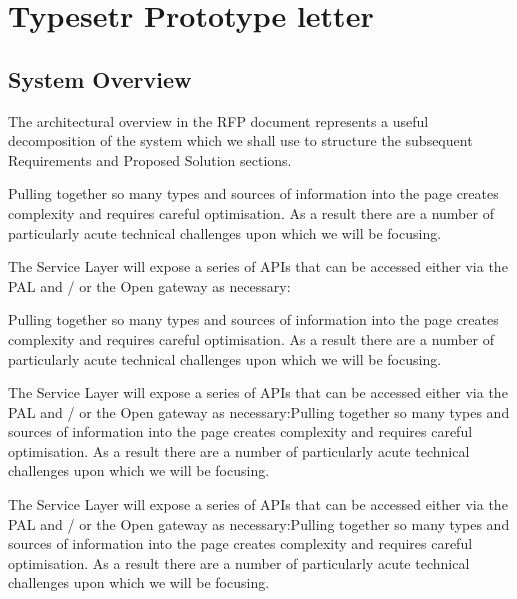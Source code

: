 \documentclass[12pt, a4paper, parskip=half,
               enlargefirstpage, pagenumber=no]{scrlttr2}
\begin{document}
\newcommand{\tystrsubtitle}{}
\newcommand{\tystrtitle}{Untitled Document}
\newcommand{\tystrauthor}{LShift}
\newcommand{\tystrclient}{LShift}
\newcommand{\tystrproject}{internal}
\newcommand{\tystraffiliation}{LShift blah blah}
\newcommand{\tystrversion}{0.0}
\newcommand{\tystrdate}{2012-07-12}



\section{ Typesetr Prototype letter}
\label{h.v0in2tf244c4}

\subsection{System Overview}
\label{h.aqxdte3o5oy}
The architectural overview in the RFP document represents a useful decomposition of the system which we shall use to structure the subsequent Requirements and Proposed Solution sections.

Pulling together so many types and sources of information into the page creates complexity and requires careful optimisation. As a result there are a number of particularly acute technical challenges upon which we will be focusing.

The Service Layer will expose a series of APIs that can be accessed either via the PAL and / or the Open gateway as necessary:

Pulling together so many types and sources of information into the page creates complexity and requires careful optimisation. As a result there are a number of particularly acute technical challenges upon which we will be focusing.

The Service Layer will expose a series of APIs that can be accessed either via the PAL and / or the Open gateway as necessary:Pulling together so many types and sources of information into the page creates complexity and requires careful optimisation. As a result there are a number of particularly acute technical challenges upon which we will be focusing.

The Service Layer will expose a series of APIs that can be accessed either via the PAL and / or the Open gateway as necessary:Pulling together so many types and sources of information into the page creates complexity and requires careful optimisation. As a result there are a number of particularly acute technical challenges upon which we will be focusing.
\end{document}
